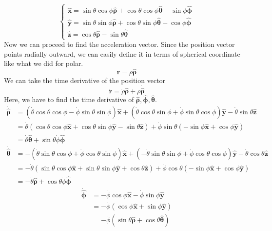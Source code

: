 \documentclass[12pt]{article}
\newcommand{\paren}[1]{\left( #1 \right)}
\newcommand{\unx}{\hat{\mathbf{x}}}
\newcommand{\uny}{\hat{\mathbf{y}}}
\newcommand{\unz}{\hat{\mathbf{z}}}
\newcommand{\untheta}{\hat{\boldsymbol\theta}}
\newcommand{\unphi}{\hat{\boldsymbol\phi}}
\newcommand{\unrho}{\hat{\boldsymbol\rho}}
\begin{document}
\begin{enumerate}
    \[
    \begin{cases}
        \unx = \sin\theta\cos\phi \unrho + \cos\theta\cos\phi \untheta -\sin\phi\unphi \\
        \uny = \sin\theta\sin\phi\unrho + \cos\theta\sin\phi\untheta +\cos\phi \unphi\\
        \unz =  \cos\theta\unrho - \sin\theta \untheta
    \end{cases}
    \]
    Now we can proceed to find the acceleration vector. Since the position vector points radially outward, we can easily define it in terms of spherical coordinate like what we did for polar. 
    \[
    \mathbf{r} = \rho\unrho
    \]
    We can take the time derivative of the position vector
    \[
    \dot{\mathbf{r}} = \dot{\rho}\unrho + \rho\dot{\unrho}
    \]
    Here, we have to find the time derivative of $\unrho,\unphi,\untheta$.
    \begin{align*}
        \dot{\unrho} &= \paren{\dot{\theta}\cos\theta\cos\phi -\dot{\phi}\sin\theta\sin\phi}\unx
                     + \paren{\dot{\theta}\cos\theta\sin\phi + \dot{\phi}\sin\theta\cos\phi}\uny
                     -\dot{\theta}\sin\theta \unz\\
                     &=\dot{\theta}\paren{\cos\theta\cos\phi \unx + \cos\theta\sin\phi \uny -\sin\theta\unz}+\dot{\phi}\sin\theta\paren{-\sin\phi \unx +\cos\phi \uny}\\
                     &= \dot{\theta}\untheta + \sin\theta\dot{\phi}\unphi
    \end{align*}
    \begin{align*}
        \dot{\untheta} &= -\paren{\dot{\theta}\sin\theta\cos\phi + \dot{\phi}\cos\theta\sin\phi}\unx + \paren{-\dot{\theta}\sin\theta\sin\phi + \dot{\phi}\cos\theta\cos\phi}\uny - \dot{\theta}\cos\theta\unz\\
                       &=-\dot{\theta}\paren{\sin\theta\cos\phi\unx + \sin\theta\sin\phi\uny +\cos\theta\unz} + \dot{\phi}\cos\theta\paren{-\sin\phi\unx + \cos\phi \uny}\\
                       &= -\dot{\theta}\unrho + \cos\theta\dot{\phi}\unphi
    \end{align*}
    \begin{align*}
        \dot{\unphi} &= -\dot\phi\cos\phi \unx - \dot\phi\sin\phi \uny\\
                    &= -\dot\phi\paren{\cos\phi \unx + \sin\phi \uny}\\
                    &= -\dot\phi\paren{\sin\theta\unrho + \cos\theta\untheta}
    \end{align*}

\end{enumerate}
\end{document}

